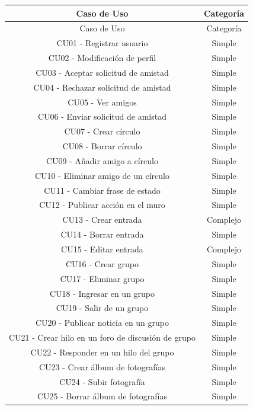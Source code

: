 \documentclass[12pt, a4paper, titlepage]{article}
\begin{document}
	\begin{center}
		\begin{longtable}{|c|c|}
			\hline
			Caso de Uso & Categoría \\ \hline
			\endfirsthead
			\hline
			Caso de Uso & Categoría \\ 
			\endhead
			CU01 - Registrar usuario & Simple \\ \hline
			CU02 - Modificación de perfil & Simple \\ \hline
			CU03 - Aceptar solicitud de amistad & Simple \\ \hline
			CU04 - Rechazar solicitud de amistad & Simple \\ \hline
			CU05 - Ver amigos & Simple \\ \hline
			CU06 - Enviar solicitud de amistad & Simple \\ \hline
			CU07 - Crear círculo & Simple \\ \hline
			CU08 - Borrar círculo & Simple \\ \hline
			CU09 - Añadir amigo a círculo & Simple \\ \hline
			CU10 - Eliminar amigo de un círculo & Simple \\ \hline
			CU11 - Cambiar frase de estado & Simple \\ \hline
			CU12 - Publicar acción en el muro & Simple \\ \hline
			CU13 - Crear entrada & Complejo \\ \hline
			CU14 - Borrar entrada & Simple \\ \hline
			CU15 - Editar entrada & Complejo \\ \hline
			CU16 - Crear grupo & Simple \\ \hline
			CU17 - Eliminar grupo & Simple \\ \hline
			CU18 - Ingresar en un grupo & Simple \\ \hline
			CU19 - Salir de un grupo & Simple \\ \hline
			CU20 - Publicar noticia en un grupo & Simple \\ \hline
			CU21 - Crear hilo en un foro de discusión de grupo & Simple \\ \hline
			CU22 - Responder en un hilo del grupo & Simple \\ \hline
			CU23 - Crear álbum de fotografías & Simple \\ \hline
			CU24 - Subir fotografía & Simple \\ \hline
			CU25 - Borrar álbum de fotografías & Simple \\ \hline

\end{longtable}
\end{center}
\end{document}
